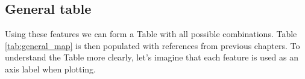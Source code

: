 

\subsection{General table}
Using these features we can form a Table with all possible combinations.
Table \ref{tab:general_map} is then populated with references from previous chapters.
To understand the Table more clearly, let's imagine that each feature is used as an axis label when plotting. 

